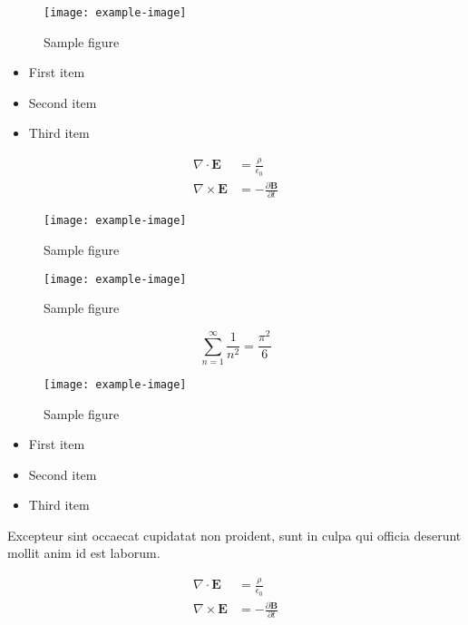 \documentclass{article}
\begin{document}
\begin{figure}[h]
    \centering
    \texttt{[image: example-image]}
    \caption{Sample figure}
    \label{fig:sample}
\end{figure}


\begin{itemize}
\item First item
\item Second item
\item Third item
\end{itemize}

\begin{align}
    \nabla \cdot \mathbf{E} &= \frac{\rho}{\epsilon_0} \\
    \nabla \times \mathbf{E} &= -\frac{\partial \mathbf{B}}{\partial t}
\end{align}

\begin{figure}[h]
    \centering
    \texttt{[image: example-image]}
    \caption{Sample figure}
    \label{fig:sample}
\end{figure}

\begin{figure}[h]
    \centering
    \texttt{[image: example-image]}
    \caption{Sample figure}
    \label{fig:sample}
\end{figure}

\begin{equation}
    \sum_{n=1}^{\infty} \frac{1}{n^2} = \frac{\pi^2}{6}
\end{equation}

\begin{figure}[h]
    \centering
    \texttt{[image: example-image]}
    \caption{Sample figure}
    \label{fig:sample}
\end{figure}


\begin{itemize}
\item First item
\item Second item
\item Third item
\end{itemize}

Excepteur sint occaecat cupidatat non proident, sunt in culpa qui officia deserunt mollit anim id est laborum.


\begin{align}
    \nabla \cdot \mathbf{E} &= \frac{\rho}{\epsilon_0} \\
    \nabla \times \mathbf{E} &= -\frac{\partial \mathbf{B}}{\partial t}
\end{align}
\end{document}
